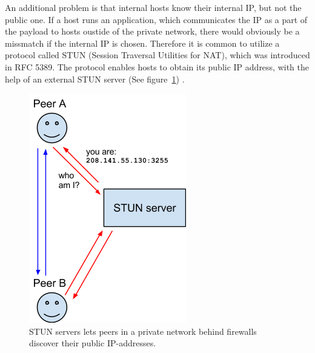 An additional problem is that internal hosts know their internal IP, but not the public one. If a host runs an application, which communicates the IP as a part of the payload to hosts oustide of the private network, there would obviously be a missmatch if the internal IP is chosen. Therefore it is common to utilize a protocol called STUN (Session Traversal Utilities for NAT), which was introduced in RFC 5389. The protocol enables hosts to obtain its public IP address, with the help of an external STUN server (See figure~\ref{fig:WebRTC - STUN}) \cite{RFC5389:Online}.

\begin{figure}[htp]
\centering
\includegraphics[width=\textwidth,height=0.2\paperheight,keepaspectratio
]{figures/webrtc-stun}
\caption{STUN servers lets peers in a private network behind firewalls discover their public IP-addresses\cite{WebRTCArchitecture:2014:Online}.}
\label{fig:WebRTC - STUN}
\end{figure}

